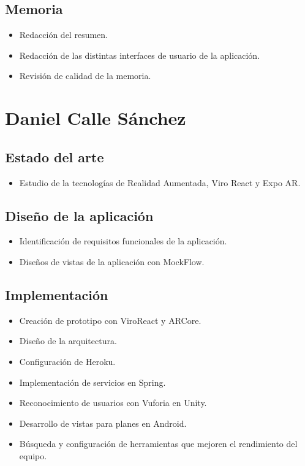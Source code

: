     \subsection{Memoria}
    \label{makereference7.1.3}
        \begin{itemize}
            \item Redacción del resumen.
            \item Redacción de las distintas interfaces de usuario de la aplicación.
            \item Revisión de calidad de la memoria.
        \end{itemize}

\section{Daniel Calle Sánchez}
\label{makereference7.2}
    \subsection{Estado del arte}
    \label{makereference7.2.1}
        \begin{itemize}
            \item Estudio de la tecnologías de Realidad Aumentada, Viro React y
            Expo AR.
        \end{itemize}
    \subsection{Diseño de la aplicación}
    \label{makereference7.2.2}
        \begin{itemize}
            \item Identificación de requisitos funcionales de la aplicación.
            \item Diseños de vistas de la aplicación con MockFlow.
        \end{itemize}
    \subsection{Implementación}
    \label{makereference7.2.3}
        \begin{itemize}
            \item Creación de prototipo con ViroReact y ARCore.
            \item Diseño de la arquitectura.
            \item Configuración de Heroku.
            \item Implementación de servicios en Spring.
            \item Reconocimiento de usuarios con Vuforia en Unity.
            \item Desarrollo de vistas para planes en Android.
            \item Búsqueda y configuración de herramientas que mejoren el
             rendimiento del equipo.
        \end{itemize}
